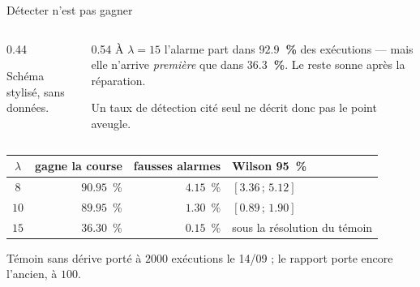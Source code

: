 \documentclass[aspectratio=169,11pt]{beamer}
\begin{document}
\begin{frame}{\hfill Détecter n'est pas gagner}
  \begin{columns}[c]
    \begin{column}{0.44\textwidth}
      \begin{center}
        \schemaZombie
      \end{center}
      \vspace{-0.4em}
      \begin{center}\tiny\color{gray}Schéma stylisé, sans données.\end{center}
    \end{column}
    \begin{column}{0.54\textwidth}
      \small
      À $\lambda = 15$ l'alarme part dans \textbf{$\num{92.9}$~\%} des exécutions
      --- mais elle n'arrive \emph{première} que dans \textbf{$\num{36.3}$~\%}.
      Le reste sonne après la réparation.

      \vspace{0.4em}
      Un taux de détection cité seul ne décrit donc pas le point aveugle.
    \end{column}
  \end{columns}

  \vspace{0.4em}
  \begin{center}
    \footnotesize
    \begin{tabular}{crrl}
      \toprule
      $\lambda$ & gagne la course & fausses alarmes & Wilson 95~\% \\
      \midrule
      $8$  & $\num{90.95}$~\% & $\num{4.15}$~\% & $[\num{3.36}\,;\,\num{5.12}]$ \\
      $10$ & $\num{89.95}$~\% & $\num{1.30}$~\% & $[\num{0.89}\,;\,\num{1.90}]$ \\
      $15$ & $\num{36.30}$~\% & $\num{0.15}$~\% & sous la résolution du témoin \\
      \bottomrule
    \end{tabular}
  \end{center}
  \vspace{-0.1em}
  {\scriptsize\color{gray}Témoin sans dérive porté à $\num{2000}$ exécutions le
  14/09 ; le rapport porte encore l'ancien, à $100$.}
\end{frame}
\end{document}
